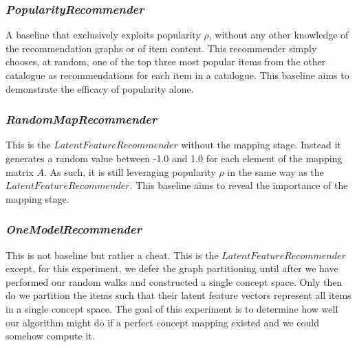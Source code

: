 \documentclass[11pt]{article}
\begin{document}
\subsubsection*{\em PopularityRecommender}
A baseline that exclusively exploits popularity $\rho$, without any other
knowledge of the recommendation graphs or of item content. This recommender
simply chooses, at random, one of the top three most popular items from the
other catalogue as recommendations for each item in a catalogue. This baseline
aims to demonstrate the efficacy of popularity alone.

\subsubsection*{\em RandomMapRecommender}
This is the $LatentFeatureRecommender$ without the mapping stage. Instead it
generates a random value between -1.0 and 1.0 for each element of the mapping
matrix $A$. As such, it is still leveraging popularity $\rho$ in the same way as
the $LatentFeatureRecommender$. This baseline aims to reveal the importance of
the mapping stage.

\subsubsection*{\em OneModelRecommender}
This is not baseline but rather a cheat. This is the $LatentFeatureRecommender$
except, for this experiment, we defer the graph partitioning until after we have
performed our random walks and constructed a single concept space. Only then do
we partition the items such that their latent feature vectors represent all
items in a single concept space. The goal of this experiment is to determine how
well our algorithm might do if a perfect concept mapping existed and we could
somehow compute it.

\end{document}
